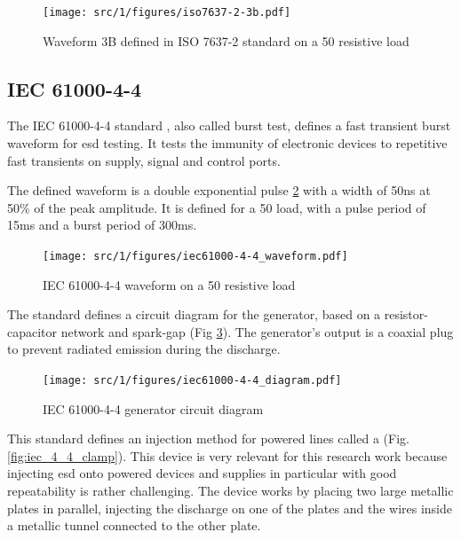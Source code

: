 \begin{figure}[!h]
  \centering
  \texttt{[image: src/1/figures/iso7637-2-3b.pdf]}
  \caption{Waveform 3B defined in ISO 7637-2 standard on a 50\textOmega{} resistive load}
  \label{fig:iso_2b_pulse}
\end{figure}

\subsection{IEC 61000-4-4}

The IEC 61000-4-4 standard \cite{iec61000-4-4}, also called burst test, defines a fast transient burst waveform for \gls{esd} testing.
It tests the immunity of electronic devices to repetitive fast transients on supply, signal and control ports.

The defined waveform is a double exponential pulse \ref{fig:iec_4_4_pulse} with a width of 50ns at 50\% of the peak amplitude.
It is defined for a 50\textOmega{} load, with a pulse period of 15ms and a burst period of 300ms.

\begin{figure}[!h]
  \centering
  \texttt{[image: src/1/figures/iec61000-4-4\_waveform.pdf]}
  \caption{IEC 61000-4-4 waveform on a 50\textOmega{} resistive load}
  \label{fig:iec_4_4_pulse}
\end{figure}

The standard defines a circuit diagram for the generator, based on a resistor-capacitor network and spark-gap (Fig \ref{fig:iec_4_4_generator}).
The generator's output is a coaxial plug to prevent radiated emission during the discharge.

\begin{figure}[!h]
  \centering
  \texttt{[image: src/1/figures/iec61000-4-4\_diagram.pdf]}
  \caption{IEC 61000-4-4 generator circuit diagram}
  \label{fig:iec_4_4_generator}
\end{figure}

This standard defines an injection method for powered lines called a  (Fig. \ref{fig:iec_4_4_clamp}).
This device is very relevant for this research work because injecting \gls{esd} onto powered devices and supplies in particular with good repeatability is rather challenging.
The device works by placing two large metallic plates in parallel, injecting the discharge on one of the plates and the wires inside a metallic tunnel connected to the other plate.


